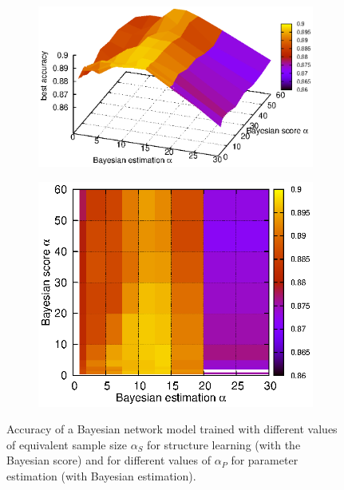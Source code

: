 \documentclass[english,cover]{fitthesis} %
\begin{document}
\begin{figure}[ht]
    \centering
    \begin{subfigure}[b]{0.45\linewidth}
        \hspace{-1.5cm}
        \includegraphics[scale=0.78]{fig/spam-holdout-whole-space-3d}
    \end{subfigure}
    \quad
    \begin{subfigure}[b]{0.45\linewidth}
        \hspace{-0.55cm}
        \includegraphics[scale=0.78]{fig/spam-holdout-whole-space-map}
    \end{subfigure}
    \caption{Accuracy of a Bayesian network model trained with different values of equivalent sample size $\alpha_S$ for structure learning (with the Bayesian score) and for different values of $\alpha_P$ for parameter estimation (with Bayesian estimation).}
    \label{fig:spam-holdout-whole-space}
\end{figure}
\end{document}
